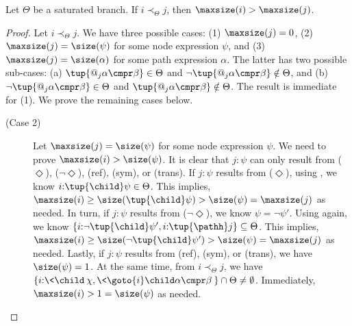 \begin{lem} \label{lemma:decreasing:length}
  Let $\Theta$ be a saturated branch. If $i \prec_\Theta j$, then $\maxsize(i) > \maxsize(j)$.
\end{lem}
\begin{proof}
  Let $i \prec_\Theta j$.
  We have three possible cases:
    (1) $\maxsize(j) = 0$,
    (2) $\maxsize(j) = \size(\psi)$ for some node expression $\psi$, and
    (3) $\maxsize(j) = \size(\alpha)$ for some path expression $\alpha$.
  The latter has two possible sub-cases:
    (a) $\tup{@_j\alpha \cmpr \beta} \in \Theta$ and $\lnot\tup{@_j\alpha \cmpr \beta} \notin \Theta$, and
    (b) $\lnot\tup{@_j\alpha \cmpr \beta} \in \Theta$ and $\tup{@_j\alpha \cmpr \beta} \notin \Theta$.
  The result is immediate for (1). 
  We prove the remaining cases below.
  
  \begin{description}
    \item[(Case 2)]
      Let $\maxsize(j) = \size(\psi)$ for some node expression $\psi$.
      We need to prove $\maxsize(i) > \size(\psi)$.
      It is clear that $j{:}\psi$ can only result from ($\Diamond$), ($\lnot\Diamond$), (ref), (sym), or (trans).
        If $j{:}\psi$ results from ($\Diamond$), using , we know $i{:}\tup{\child}\psi \in \Theta$.
        This implies, $\maxsize(i) \geq \size(\tup{\child} \psi) > \size (\psi) = \maxsize(j)$ as needed.
        In turn, if $j{:}\psi$ results from ($\lnot\Diamond$), we know $\psi = \lnot\psi'$.
        Using  again, we know $\{i{:}\lnot\tup{\child}\psi', i{:}\tup{\pathh}j\} \subseteq \Theta$.
        This implies, $\maxsize(i) \geq \size(\lnot\tup{\child} \psi') > \size (\psi) = \maxsize(j)$ as needed.
        Lastly, if $j{:}\psi$ results from (ref), (sym), or (trans), we have ${\size(\psi)=1}$. 
        At the same time, from $i \prec_{\Theta}j$, we have $\{i{:}\<\child\>\chi, \<\goto{i}\child\alpha \cmpr \beta\>\} \cap \Theta \neq \emptyset$.
        Immediately, $\maxsize(i) > 1 = \size(\psi)$ as needed.


\end{description}
\end{proof}
